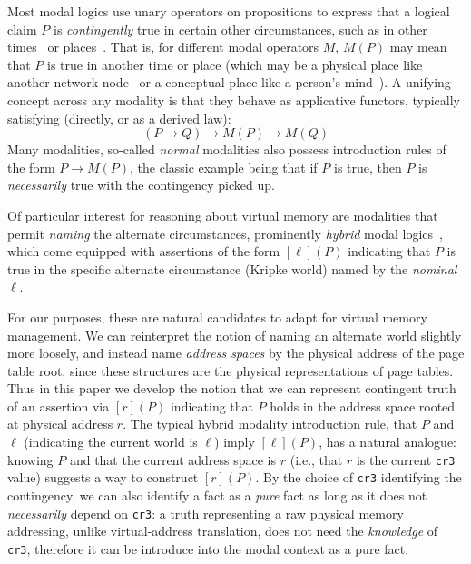 Most modal logics use unary operators on propositions to express that a logical claim $P$ is \emph{contingently} true 
in certain other circumstances, such as in other times~\cite{pnueli1977temporal} or places~\cite{gordon2019modal}. That is, for 
different modal operators $M$, $M(P)$ may mean that $P$ is true in another time or place (which may be a physical place 
like another network node~\cite{murphy2008type,gordon2019modal} or a conceptual place like a person's 
mind~\cite{hintikka1962knowledge}). A unifying concept across any modality is that they behave as applicative functors, 
typically satisfying (directly, or as a derived law):
\[ (P\rightarrow Q) \rightarrow M(P) \rightarrow M(Q)\]
Many modalities, so-called \emph{normal} modalities also possess introduction rules of the form $P\rightarrow M(P)$, 
the classic example being that if $P$ is true, then $P$ is \emph{necessarily} true with the contingency picked up.%

Of particular interest for reasoning about virtual memory are modalities that permit \emph{naming} the alternate 
circumstances, prominently \emph{hybrid} modal logics~\cite{blackburn1995hybrid,areces2001hybrid}, which come equipped 
with assertions of the form $[\ell](P)$ indicating that $P$ is true in the specific alternate circumstance (Kripke world)
 named by the \emph{nominal} $\ell$.

For our purposes, these are natural candidates to adapt for virtual memory management. We can reinterpret the notion of 
naming an alternate world slightly more loosely, and instead name \emph{address spaces} by the physical address of the 
page table root, since these structures are the physical representations of page tables. Thus in this paper we develop 
the notion that we can represent contingent truth of an assertion via $[r](P)$ indicating that $P$ holds in the address 
space rooted at physical address $r$.
The typical hybrid modality introduction rule, that $P$ and $\ell$ (indicating the current world is $\ell$) imply 
$[\ell](P)$, has a natural analogue: knowing $P$ and that the current address space is $r$ (i.e., that $r$ is the 
current \texttt{cr3} value) suggests a way to construct $[r](P)$. By the choice of \texttt{cr3} identifying the contingency,
we can also identify a fact as a \textit{pure} fact as long as it does not \textit{necessarily} depend on \texttt{cr3}: a truth representing a raw physical memory addressing, unlike virtual-address translation, does not need the \textit{knowledge} of \texttt{cr3}, therefore it can be introduce into the modal context as a pure fact.

